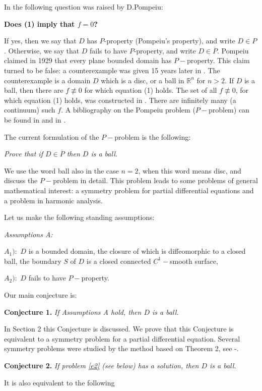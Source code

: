 \documentclass[12pt,leqno]{article}
\def\R{\mathbb{R}}
\begin{document}
In \cite{P} the following question was raised by D.Pompeiu:

{\bf Does (1) imply that  $f = 0$?}

If yes, then we say that  $D$  has $P$-property (Pompeiu's
property), and write $D\in P$. Otherwise, we say
that $D$ fails to have $P$-property, and write  $D\in \overline{P}$.
Pompeiu claimed in 1929 that every plane bounded domain has $P-$property.
This claim turned to be false:
a counterexample was given 15 years later in \cite{C}. The counterexample
is a
domain $D$ which is a disc, or a ball in $\R^n$ for $n> 2$. If $D$ is a
ball, then there are $f\not\equiv 0$ for which equation (1) holds.
The set of all $f\not\equiv 0$, for which equation
(1) holds, was constructed in \cite{R363}. There are infinitely many
(a continuum)  such $f$.
A bibliography on the Pompeiu
problem ($P-$problem) can be found in \cite{Z} and
in \cite{R363}.

The current formulation of the $P-$problem is the following:

{\it Prove that if $D\in \overline{P}$
then $D$ is a ball.}

We use the word ball also in the case $n=2$, when this word means
disc, and discuss the $P-$problem in detail. This problem leads
to some problems of general mathematical interest: a symmetry problem
for partial differential equations and a problem in harmonic analysis.

Let us make the following standing assumptions:

{\it Assumptions A:

$A_1):$ $D$ is a bounded domain, the closure of which is diffeomorphic to
a
closed ball, the boundary $S$ of $D$ is a closed connected $C^1-$smooth
surface,

$A_2):$ $D$ fails to have $P-$property.
}



Our main conjecture is:

{\bf Conjecture 1.} {\it If Assumptions A hold, then $D$ is a ball.}

In Section 2 this Conjecture  is discussed. We prove that this Conjecture
is equivalent to a symmetry problem for a partial differential equation.
Several symmetry problems were studied by the method based on Theorem 2,
see \cite{R512}-\cite{R614}.

{\bf Conjecture 2.} {\it If problem \eqref{e2} (see below) has a solution,
then $D$ is a ball.}

It is also equivalent to the following
\end{document}
